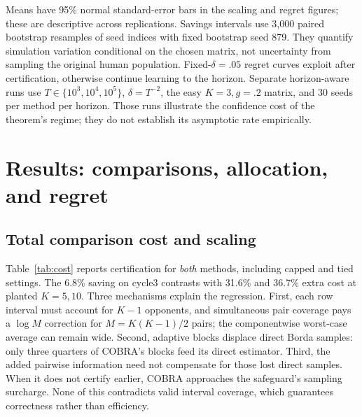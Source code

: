 \documentclass[11pt,a4paper]{article}
\begin{document}
Means have 95\% normal standard-error bars in the scaling and regret figures; these are descriptive across replications. Savings intervals use 3,000 paired bootstrap resamples of seed indices with fixed bootstrap seed 879. They quantify simulation variation conditional on the chosen matrix, not uncertainty from sampling the original human population. Fixed-$\delta=.05$ regret curves exploit after certification, otherwise continue learning to the horizon. Separate horizon-aware runs use $T\in\{10^3,10^4,10^5\}$, $\delta=T^{-2}$, the easy $K=3,g=.2$ matrix, and 30 seeds per method per horizon. Those runs illustrate the confidence cost of the theorem's regime; they do not establish its asymptotic rate empirically.

\section{Results: comparisons, allocation, and regret}
\subsection{Total comparison cost and scaling}
Table~\ref{tab:cost} reports certification for \emph{both} methods, including capped and tied settings. The 6.8\% saving on cycle3 contrasts with 31.6\% and 36.7\% extra cost at planted $K=5,10$. Three mechanisms explain the regression. First, each row interval must account for $K-1$ opponents, and simultaneous pair coverage pays a $\log M$ correction for $M=K(K-1)/2$ pairs; the componentwise worst-case average can remain wide. Second, adaptive blocks displace direct Borda samples: only three quarters of COBRA's blocks feed its direct estimator. Third, the added pairwise information need not compensate for those lost direct samples. When it does not certify earlier, COBRA approaches the safeguard's sampling surcharge. None of this contradicts valid interval coverage, which guarantees correctness rather than efficiency.
\end{document}
